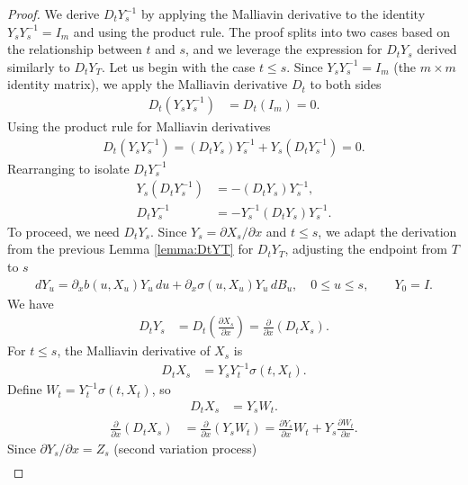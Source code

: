 \documentclass[]{interact}
\newcommand{\1}{\mathbf{1}}
\theoremstyle{plain}%
\theoremstyle{definition}
\theoremstyle{remark}
\numberwithin{equation}{section}
\begin{document}
\begin{proof}
We derive \( D_t Y_s^{-1} \) by applying the Malliavin derivative to the identity \( Y_s Y_s^{-1} = I_m \) and using the product rule. The proof splits into two cases based on the relationship between \( t \) and \( s \), and we leverage the expression for \( D_t Y_s \) derived similarly to \( D_t Y_T \).
%
Let us begin with the case \( t \leq s \). Since \( Y_s Y_s^{-1} = I_m \) (the \( m \times m \) identity matrix), we apply the Malliavin derivative \( D_t \) to both sides
\begin{align*}
D_t (Y_s Y_s^{-1}) &= D_t (I_m) = 0.
\end{align*}
Using the product rule for Malliavin derivatives
\begin{align*}
D_t (Y_s Y_s^{-1}) = (D_t Y_s) Y_s^{-1} + Y_s (D_t Y_s^{-1}) = 0.
\end{align*}
Rearranging to isolate \( D_t Y_s^{-1} \)
\begin{align*}
Y_s (D_t Y_s^{-1}) &= - (D_t Y_s) Y_s^{-1}, \\
D_t Y_s^{-1} &= - Y_s^{-1} (D_t Y_s) Y_s^{-1}.
\end{align*}
To proceed, we need \( D_t Y_s \). Since \( Y_s = \partial X_s/\partial x \) and \( t \leq s \), we adapt the derivation from the previous Lemma \ref{lemma:DtYT} for \( D_t Y_T \), adjusting the endpoint from \( T \) to \( s \)
\begin{align*}
dY_u = \partial_x b(u, X_u) Y_u \, du + \partial_x \sigma(u, X_u) Y_u \, dB_u, \quad 0 \leq u \leq s, \qquad 
Y_0 = I.
\end{align*}
We have 
\begin{align*}
D_t Y_s &= D_t \left( \frac{\partial X_s}{\partial x} \right) = \frac{\partial}{\partial x} (D_t X_s).
\end{align*}
For \( t \leq s \), the Malliavin derivative of \( X_s \) is
\begin{align*}
D_t X_s &= Y_s Y_t^{-1} \sigma(t, X_t).
\end{align*}
Define \( W_t = Y_t^{-1} \sigma(t, X_t) \), so
\begin{align*}
D_t X_s &= Y_s W_t.
\end{align*}
%
%
\begin{align*}
\frac{\partial}{\partial x} (D_t X_s) &= \frac{\partial}{\partial x} (Y_s W_t) = \frac{\partial Y_s}{\partial x} W_t + Y_s \frac{\partial W_t}{\partial x}.
\end{align*}
Since \( \partial Y_s/\partial x = Z_s \) (second variation process)
\begin{align*}

\end{align*}
\end{proof}
\end{document}
